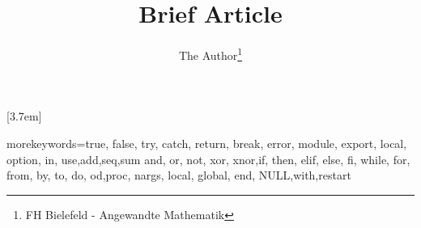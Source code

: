 
\usepackage{titletoc} %
[3.7em]{}{\contentslabel{2.2em}}{}{\titlerule*[0.3pc]{ }\contentspage}


	\title{Brief Article}
	\author{The Author\thanks{FH Bielefeld - Angewandte Mathematik}}


\usepackage{xcolor}
\usepackage[]{listings}
   {morekeywords={true, false, try, catch, return, break, error,%
                  module, export, local, option, in, use,add,seq,sum%
                  and, or, not, xor, xnor,if, then, elif, else, fi,%
                  while, for, from, by, to, do, od,proc, nargs, %
                  local, global, end, NULL,with,restart}}
     { \renewcommand*\thelstnumber{$\boldsymbol{>}$\hfill}%
     }{}



\def\MapleInput#1{\noindent{{\small $>$ {\tt \color{MapleRed}{#1} }}}}
\def\MapleOutput#1{{\begin{center}\begin{math} \color{MapleBlue}{#1}\end{math} \end{center}}}
\def\MapleWarning#1{\noindent{{\small {\tt \color{MaplePink}{#1} }}}}

\def\MatlabInput#1{\noindent{{{\tt {#1} }}}}


\usepackage{tikz}

\usepackage{alltt}

\usepackage{enumitem}

\usepackage{color}

